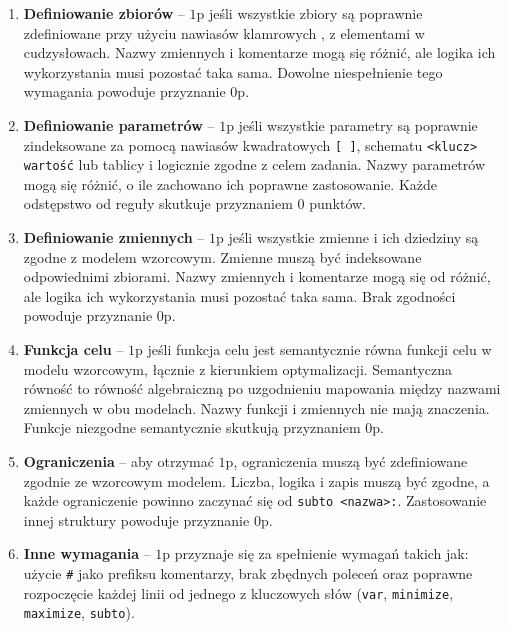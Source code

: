 \begin{enumerate}
\item \textbf{Definiowanie zbiorów} -- $1$p jeśli wszystkie zbiory są poprawnie zdefiniowane przy użyciu nawiasów klamrowych \texttt{{}}, z elementami w cudzysłowach. Nazwy zmiennych i komentarze mogą się różnić, ale logika ich wykorzystania musi pozostać taka sama. Dowolne niespełnienie tego wymagania powoduje przyznanie $0$p. %
\item \textbf{Definiowanie parametrów} -- $1$p jeśli wszystkie parametry są poprawnie zindeksowane za pomocą nawiasów kwadratowych \texttt{[ ]}, schematu \texttt{<klucz> wartość} lub tablicy i logicznie zgodne z celem zadania. Nazwy parametrów mogą się różnić, o ile zachowano ich poprawne zastosowanie. Każde odstępstwo od reguły skutkuje przyznaniem $0$ punktów.
\item \textbf{Definiowanie zmiennych} -- $1$p jeśli wszystkie zmienne i ich dziedziny są zgodne z modelem wzorcowym. Zmienne muszą być indeksowane odpowiednimi zbiorami. Nazwy zmiennych i komentarze mogą się od różnić, ale logika ich wykorzystania musi pozostać taka sama. Brak zgodności powoduje przyznanie $0$p.
\item \textbf{Funkcja celu} -- $1$p jeśli funkcja celu jest semantycznie równa funkcji celu w modelu wzorcowym, łącznie z kierunkiem optymalizacji. Semantyczna równość to równość algebraiczną po uzgodnieniu mapowania między nazwami zmiennych w obu modelach. Nazwy funkcji i zmiennych nie mają znaczenia. Funkcje niezgodne semantycznie skutkują przyznaniem $0$p.
\item \textbf{Ograniczenia} -- aby otrzymać $1$p, ograniczenia muszą być zdefiniowane zgodnie ze wzorcowym modelem. Liczba, logika i zapis muszą być zgodne, a każde ograniczenie powinno zaczynać się od \texttt{subto <nazwa>:}. Zastosowanie innej struktury powoduje przyznanie $0$p.
\item \textbf{Inne wymagania} -- $1$p przyznaje się za spełnienie wymagań takich jak: użycie \texttt{\#} jako prefiksu komentarzy, brak zbędnych poleceń oraz poprawne rozpoczęcie każdej linii od jednego z kluczowych słów (\texttt{var}, \texttt{minimize}, \texttt{maximize}, \texttt{subto}). 
\end{enumerate}


